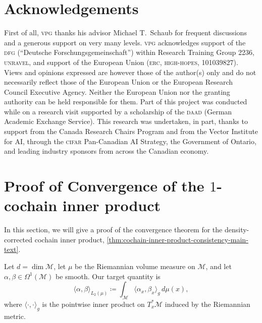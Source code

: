 \documentclass[a4paper,11pt, DIV=10]{scrartcl}
\numberwithin{equation}{section}
\theoremstyle{definition}
\theoremstyle{remark}
\newcommand{\mc}[1]{\mathcal{#1}}
\begin{document}
\section*{Acknowledgements}
First of all, \textsc{vpg} thanks his advisor Michael T.\ Schaub for frequent discussions and a generous support on very many levels.
\textsc{vpg} acknowledges support of the \textsc{dfg} (\enquote{Deutsche Forschungsgemeinschaft}) within Research Training Group 2236, \textsc{unravel}, and support of the European Union (\textsc{erc}, \textsc{high-hopes}, 101039827).
Views and opinions expressed are however those of the author(s) only and do not necessarily reflect those of the European Union or the European Research Council Executive Agency. Neither the European Union nor the granting authority can be held responsible for them.
Part of this project was conducted while on a research visit supported by a scholarship of the \textsc{daad} (German Academic Exchange Service).
This research was undertaken, in part, thanks to support from the Canada Research Chairs Program and from the Vector Institute for AI, through the \textsc{cifar} Pan-Canadian AI Strategy, the Government of Ontario, and leading industry sponsors from across the Canadian economy.


\printbibliography
\appendix
\section{Proof of Convergence of the $1$-cochain inner product}
\label{sec:circular-convergence}
In this section, we will give a proof of the convergence theorem for the density-corrected cochain inner product, \cref{thm:cochain-inner-product-consistency-main-text}.

Let $d=\dim \mc{M}$, let $\mu$ be the Riemannian volume measure on $\mc{M}$, and let $\alpha,\beta\in \Omega^1(\mc{M})$ be smooth. Our target quantity is
\begin{equation}
\langle \alpha,\beta\rangle_{L_2(\mu)}\coloneq \int_{\mc{M}} \langle \alpha_x,\beta_x\rangle_g\,d\mu(x),
\end{equation}
where $\langle \cdot,\cdot\rangle_g$ is the pointwise inner product on $T_x^*\mc{M}$ induced by the Riemannian metric.
\end{document}
